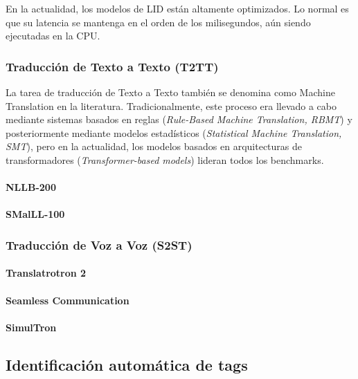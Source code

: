 En la actualidad, los modelos de LID están altamente optimizados. Lo normal es que su latencia se mantenga en el orden de los milisegundos, aún siendo ejecutadas en la CPU.



\subsubsection{Traducción de Texto a Texto (T2TT)}  
La tarea de traducción de Texto a Texto también se denomina como Machine Translation en la literatura. Tradicionalmente, este proceso era llevado a cabo mediante sistemas basados en reglas (\textit{Rule-Based Machine Translation, RBMT}) y posteriormente mediante modelos estadísticos (\textit{Statistical Machine Translation, SMT}), pero en la actualidad, los modelos basados en arquitecturas de transformadores (\textit{Transformer-based models}) lideran todos los benchmarks.

\paragraph{NLLB-200}
\paragraph{SMalLL-100}

\subsubsection{Traducción de Voz a Voz (S2ST)}
\paragraph{Translatrotron 2}
\paragraph{Seamless Communication}
\paragraph{SimulTron}

\subsection{Identificación automática de tags}

